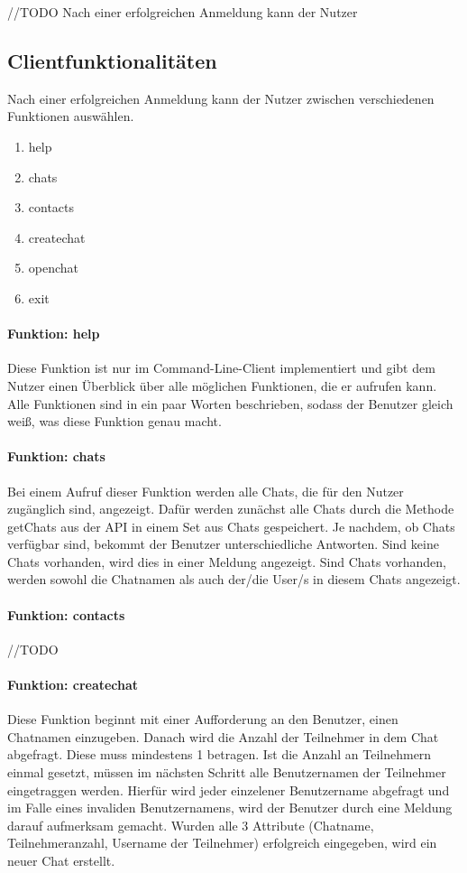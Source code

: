 //TODO Nach einer erfolgreichen Anmeldung kann der Nutzer
\subsection{Clientfunktionalitäten}
Nach einer erfolgreichen Anmeldung kann der Nutzer zwischen verschiedenen Funktionen auswählen.
\begin{enumerate}
    \item help
    \item chats
    \item contacts
    \item createchat
    \item openchat
    \item exit
\end{enumerate}
\paragraph{Funktion: help}
Diese Funktion ist nur im Command-Line-Client implementiert und gibt dem Nutzer einen Überblick
über alle möglichen Funktionen, die er aufrufen kann. Alle Funktionen sind in ein paar Worten beschrieben,
sodass der Benutzer gleich weiß, was diese Funktion genau macht.
\paragraph{Funktion: chats}
Bei einem Aufruf dieser Funktion werden alle Chats, die für den Nutzer zugänglich sind, angezeigt.
Dafür werden zunächst alle Chats durch die Methode getChats aus der API in einem Set aus Chats gespeichert.
Je nachdem, ob Chats verfügbar sind, bekommt der Benutzer unterschiedliche Antworten.
Sind keine Chats vorhanden, wird dies in einer Meldung angezeigt.
Sind Chats vorhanden, werden sowohl die Chatnamen als auch der/die User/s in diesem Chats angezeigt.
\paragraph{Funktion: contacts}
//TODO
\paragraph{Funktion: createchat}
Diese Funktion beginnt mit einer Aufforderung an den Benutzer, einen Chatnamen einzugeben.
Danach wird die Anzahl der Teilnehmer in dem Chat abgefragt. Diese muss mindestens 1 betragen.
Ist die Anzahl an Teilnehmern einmal gesetzt, müssen im nächsten Schritt alle Benutzernamen
der Teilnehmer eingetraggen werden. Hierfür wird jeder einzelener Benutzername abgefragt und
im Falle eines invaliden Benutzernamens, wird der Benutzer durch eine Meldung darauf aufmerksam gemacht.
Wurden alle 3 Attribute (Chatname, Teilnehmeranzahl, Username der Teilnehmer) erfolgreich eingegeben,
wird ein neuer Chat erstellt.
